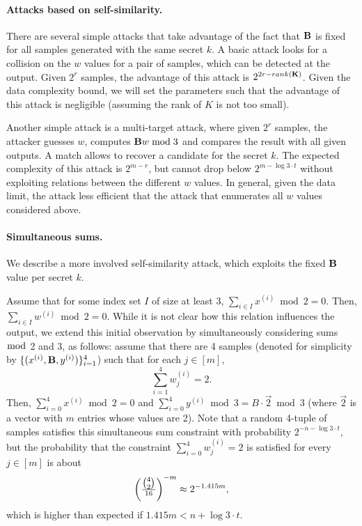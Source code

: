 \paragraph{Attacks based on self-similarity.}


There are several simple attacks that take advantage of the fact that $\mat{B}$ is fixed for all samples generated with the same secret $k$.
A basic attack looks for a collision on the $w$ values for a pair of samples, which can be detected at the output.
Given $2^r$ samples, the advantage of this attack is $2^{2r - rank(\mat{K})}$. Given the data complexity bound,
we will set the parameters such that the advantage of this attack is negligible (assuming the rank of $K$ is not too small).


Another simple attack is a multi-target attack, where given $2^r$ samples, the attacker guesses $w$, computes $\mat{B} w \bmod 3$ and compares the result with all given outputs. A match allows to recover a candidate for the secret $k$.
The expected complexity of this attack is $2^{m-r}$, but cannot drop below $2^{m - \log 3 \cdot t}$ without exploiting relations between the different $w$ values. In general, given the data limit, the attack less efficient that the attack that enumerates all $w$ values considered above.

\paragraph{Simultaneous sums.}

We describe a more involved self-similarity attack, which exploits the fixed $\mat{B}$ value per secret $k$.

Assume that for some index set $I$ of size at least 3, $\sum_{i \in I} x^{(i)} \bmod 2 = 0$. Then, $\sum_{i \in I} w^{(i)} \bmod 2 = 0$. While it is not clear how this relation influences the output,
we extend this initial observation by simultaneously considering sums $\bmod$ 2 and 3, as follows:
assume that there are 4 samples (denoted for simplicity
by $ \{(x^{(i)},\mat{B},y^{(i)})\}_{i=1}^{4}$) such that for each $j \in [m]$,
$$\sum_{i = 1}^{4} w^{(i)}_j = 2.$$
Then, $\sum_{i = 0}^{4} x^{(i)} \bmod 2 = 0$ and $\sum_{i = 0}^{4} y^{(i)} \bmod 3 = B \cdot \vec{2} \bmod 3$ (where $\vec{2}$ is a vector with $m$ entries whose values are 2).
Note that a random 4-tuple of samples satisfies this simultaneous sum constraint with probability
$2^{-n - \log 3 \cdot t}$, but the probability that the constraint $\sum_{i = 0}^{4} w^{(i)}_j = 2$ is satisfied for every $j \in [m]$ is about
$$\left( \tfrac{\tbinom{4}{2}}{16} \right) ^{-m} \approx 2^{- 1.415 m},$$
which is higher than expected if $1.415 m < n + \log 3 \cdot t $.

